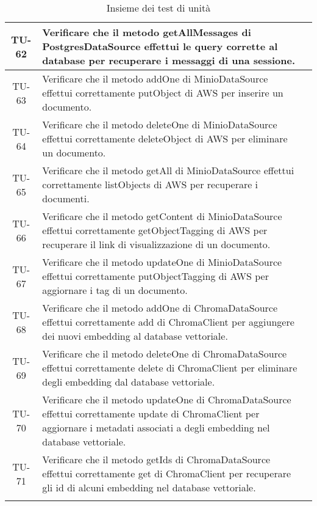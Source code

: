 \begin{xltabular}{\textwidth}{| c | X | c |}
    \hline
    TU-62 & Verificare che il metodo getAllMessages di PostgresDataSource effettui le query corrette al database per recuperare i messaggi di una sessione. & \textcolor{cmarkcolor}{} \\
    \hline
    TU-63 & Verificare che il metodo addOne di MinioDataSource effettui correttamente putObject di AWS per inserire un documento. & \textcolor{cmarkcolor}{} \\
    \hline
    TU-64 & Verificare che il metodo deleteOne di MinioDataSource effettui correttamente deleteObject di AWS per eliminare un documento. & \textcolor{cmarkcolor}{} \\
    \hline
    TU-65 & Verificare che il metodo getAll di MinioDataSource effettui correttamente listObjects di AWS per recuperare i documenti. & \textcolor{cmarkcolor}{} \\
    \hline
    TU-66 & Verificare che il metodo getContent di MinioDataSource effettui correttamente getObjectTagging di AWS per recuperare il link di visualizzazione di un documento. & \textcolor{cmarkcolor}{} \\
    \hline
    TU-67 & Verificare che il metodo updateOne di MinioDataSource effettui correttamente putObjectTagging di AWS per aggiornare i tag di un documento. & \textcolor{cmarkcolor}{} \\
    \hline
    TU-68 & Verificare che il metodo addOne di ChromaDataSource effettui correttamente add di ChromaClient per aggiungere dei nuovi embedding al database vettoriale. & \textcolor{cmarkcolor}{} \\
    \hline
    TU-69 & Verificare che il metodo deleteOne di ChromaDataSource effettui correttamente delete di ChromaClient per eliminare degli embedding dal database vettoriale. & \textcolor{cmarkcolor}{} \\
    \hline
    TU-70 & Verificare che il metodo updateOne di ChromaDataSource effettui correttamente update di ChromaClient per aggiornare i metadati associati a degli embedding nel database vettoriale. & \textcolor{cmarkcolor}{} \\
    \hline
    TU-71 & Verificare che il metodo getIds di ChromaDataSource effettui correttamente get di ChromaClient per recuperare gli id di alcuni embedding nel database vettoriale. & \textcolor{cmarkcolor}{} \\
    \hline
     \caption{Insieme dei test di unità}
    \label{tab:testunita}
\end{xltabular}

